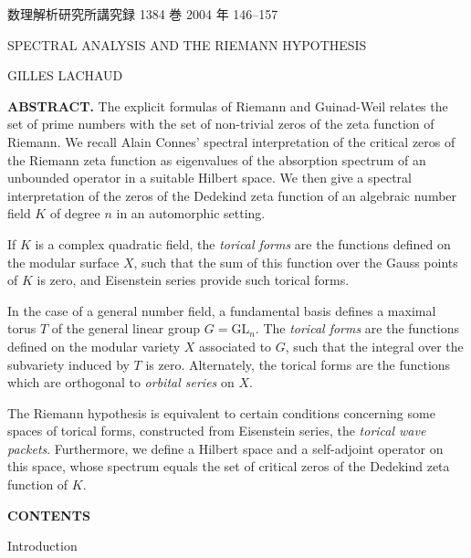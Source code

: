 \documentclass[12pt]{article}
\begin{document}
\thispagestyle{empty}

\noindent
数理解析研究所講究録 1384 巻 2004 年 146--157

\vspace{2em}

\begin{center}
{\Large SPECTRAL ANALYSIS AND THE RIEMANN HYPOTHESIS}

\vspace{1em}

GILLES LACHAUD
\end{center}

\vspace{1em}

\noindent
\textbf{ABSTRACT.} The explicit formulas of Riemann and Guinad-Weil relates the set of prime numbers with the set of non-trivial zeros of the zeta function of Riemann. We recall Alain Connes' spectral interpretation of the critical zeros of the Riemann zeta function as eigenvalues of the absorption spectrum of an unbounded operator in a suitable Hilbert space. We then give a spectral interpretation of the zeros of the Dedekind zeta function of an algebraic number field $K$ of degree $n$ in an automorphic setting.

If $K$ is a complex quadratic field, the \emph{torical forms} are the functions defined on the modular surface $X$, such that the sum of this function over the Gauss points of $K$ is zero, and Eisenstein series provide such torical forms.

In the case of a general number field, a fundamental basis defines a maximal torus $T$ of the general linear group $G = \mathrm{GL}_n$. The \emph{torical forms} are the functions defined on the modular variety $X$ associated to $G$, such that the integral over the subvariety induced by $T$ is zero. Alternately, the torical forms are the functions which are orthogonal to \emph{orbital series} on $X$.

The Riemann hypothesis is equivalent to certain conditions concerning some spaces of torical forms, constructed from Eisenstein series, the \emph{torical wave packets}. Furthermore, we define a Hilbert space and a self-adjoint operator on this space, whose spectrum equals the set of critical zeros of the Dedekind zeta function of $K$.

\vspace{2em}

\noindent
\textbf{CONTENTS}

\medskip

\noindent
Introduction 
\end{document}

